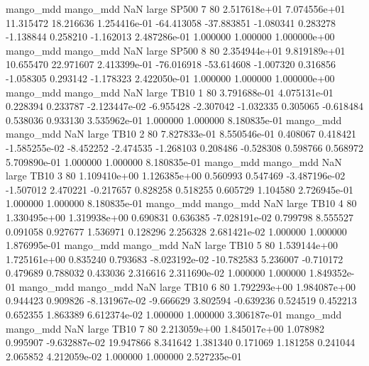 mango_mdd mango_mdd                   NaN      large    SP500                 7 80 2.517618e+01   7.074556e+01     11.315472      18.216636  1.254416e-01    -64.413058    -37.883851    -1.080341       0.283278 -1.138844   0.258210    -1.162013   2.487286e-01            1.000000        1.000000        1.000000e+00
mango_mdd mango_mdd                   NaN      large    SP500                 8 80 2.354944e+01   9.819189e+01     10.655470      22.971607  2.413399e-01    -76.016918    -53.614608    -1.007320       0.316856 -1.058305   0.293142    -1.178323   2.422050e-01            1.000000        1.000000        1.000000e+00
mango_mdd mango_mdd                   NaN      large     TB10                 1 80 3.791688e-01   4.075131e-01      0.228394       0.233787 -2.123447e-02     -6.955428     -2.307042    -1.032335       0.305065 -0.618484   0.538036     0.933130   3.535962e-01            1.000000        1.000000        8.180835e-01
mango_mdd mango_mdd                   NaN      large     TB10                 2 80 7.827833e-01   8.550546e-01      0.408067       0.418421 -1.585255e-02     -8.452252     -2.474535    -1.268103       0.208486 -0.528308   0.598766     0.568972   5.709890e-01            1.000000        1.000000        8.180835e-01
mango_mdd mango_mdd                   NaN      large     TB10                 3 80 1.109410e+00   1.126385e+00      0.560993       0.547469 -3.487196e-02     -1.507012      2.470221    -0.217657       0.828258  0.518255   0.605729     1.104580   2.726945e-01            1.000000        1.000000        8.180835e-01
mango_mdd mango_mdd                   NaN      large     TB10                 4 80 1.330495e+00   1.319938e+00      0.690831       0.636385 -7.028191e-02      0.799798      8.555527     0.091058       0.927677  1.536971   0.128296     2.256328   2.681421e-02            1.000000        1.000000        1.876995e-01
mango_mdd mango_mdd                   NaN      large     TB10                 5 80 1.539144e+00   1.725161e+00      0.835240       0.793683 -8.023192e-02    -10.782583      5.236007    -0.710172       0.479689  0.788032   0.433036     2.316616   2.311690e-02            1.000000        1.000000        1.849352e-01
mango_mdd mango_mdd                   NaN      large     TB10                 6 80 1.792293e+00   1.984087e+00      0.944423       0.909826 -8.131967e-02     -9.666629      3.802594    -0.639236       0.524519  0.452213   0.652355     1.863389   6.612374e-02            1.000000        1.000000        3.306187e-01
mango_mdd mango_mdd                   NaN      large     TB10                 7 80 2.213059e+00   1.845017e+00      1.078982       0.995907 -9.632887e-02     19.947866      8.341642     1.381340       0.171069  1.181258   0.241044     2.065852   4.212059e-02            1.000000        1.000000        2.527235e-01
